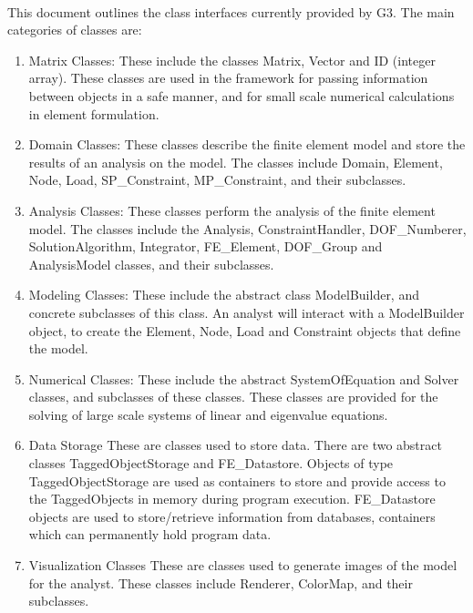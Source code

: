  \\
This document outlines the class interfaces currently provided by G3.
The main categories of classes are:
\begin{enumerate} 

\item Matrix Classes: These include the classes Matrix,
Vector and ID (integer array). These classes are used in the framework
for passing information between objects in a safe manner, and for
small scale numerical calculations in element formulation.

\item Domain Classes: These classes describe the finite element model
and store the results of an analysis on the model. The classes
include Domain, Element, Node, Load, SP\_Constraint, MP\_Constraint,
and their subclasses.   

\item Analysis Classes: These classes perform the analysis of the
finite element model. The classes include the Analysis,
ConstraintHandler, DOF\_Numberer, SolutionAlgorithm, Integrator,
FE\_Element, DOF\_Group and AnalysisModel classes, and their
subclasses.  

\item Modeling Classes: These include the abstract class
ModelBuilder, and concrete subclasses of this class. An analyst will
interact with a ModelBuilder object, to create the Element, Node, Load
and Constraint objects that define the model. 

\item Numerical Classes: These include the abstract SystemOfEquation
and Solver classes, and subclasses of these classes. These classes are
provided for the solving of large scale systems of linear and eigenvalue
equations. 

\item{Data Storage} These are classes used to store data. There are
two abstract classes TaggedObjectStorage and FE\_Datastore. Objects of
type TaggedObjectStorage are used as containers to store and provide
access to the TaggedObjects in memory during program
execution. FE\_Datastore objects are used to store/retrieve
information from databases, containers which can permanently hold
program data. 

\item {Visualization Classes} These are classes used to generate images
of the model for the analyst. These classes include Renderer,
ColorMap, and their subclasses.


\end{enumerate}

